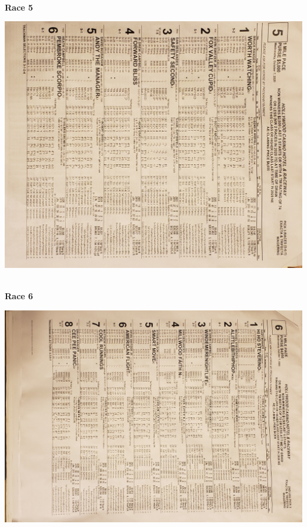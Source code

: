 \documentclass{article}
\begin{document}
\newpage
\begin{center}
\small{~\\}
\textbf{\LARGE{\textcolor[rgb]{0,0,0}{Race 5 }}}\\
\begin{turn}{90}
\includegraphics[scale=0.12]{race05.jpg}
\end{turn}
\end{center}

\newpage
\begin{center}
\small{~\\}
\textbf{\LARGE{\textcolor[rgb]{0,0,0}{Race 6 }}}\\
\begin{turn}{90}
\includegraphics[scale=0.10]{race06.jpg}
\end{turn}
\end{center}
\end{document}
